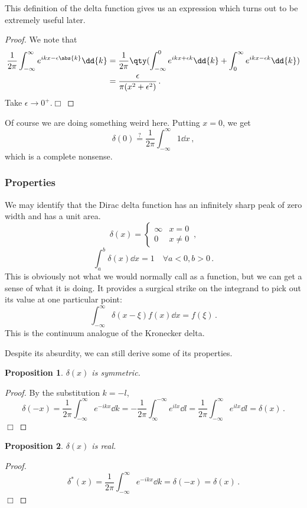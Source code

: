 \documentclass{article}
\theoremstyle{plain}\theoremheaderfont{\normalfont\itshape}\theorembodyfont{\rmfamily}\theoremseparator{.}\newtheorem*{rem}{Remark}\newtheorem*{ex}{Example}\newtheorem*{proof}{Proof}\newtheorem*{altp}{Alternative proof}
\theoremstyle{plain}\theoremheaderfont{\normalfont\bfseries}\theorembodyfont{\rmfamily}\theoremseparator{.}\newtheorem{thm}{Theorem}[section]\newtheorem{lem}[thm]{Lemma}\newtheorem{prop}[thm]{Proposition}\newtheorem*{cor}{Corollary}\newtheorem{defn}[thm]{Definition}\newtheorem{clm}[thm]{Claim}\newtheorem{clminproof}{Claim}
\theoremstyle{break}\theoremheaderfont{\normalfont\itshape}\theorembodyfont{\rmfamily}\theoremseparator{.\medskip}\newtheorem*{proofskip}{Proof}\newtheorem*{exs}{Examples}\newtheorem*{rems}{Remarks}
\theoremstyle{break}\theoremheaderfont{\normalfont\bfseries}\theorembodyfont{\rmfamily}\theoremseparator{.\medskip}\newtheorem{lemskip}[thm]{Lemma}\newtheorem{defnskip}[thm]{Definition}\newtheorem{propskip}[thm]{Proposition}\newtheorem{thmskip}[thm]{Theorem}
\numberwithin{equation}{section}
\newcommand{\qed}{\hfill\ensuremath{\Box}}
\begin{document}
	This definition of the delta function gives us an expression which turns out to be extremely useful later.
	\begin{prop}\label[prop]{Fourier_one}
		\[\delta(x)=\frac{1}{2\pi}\int_{-\infty}^{\infty}e^{ikx}\dd{k}\,.\]
	\end{prop}
	\begin{proof}
		We note that
		\begin{align*}
			\frac{1}{2\pi}\int_{-\infty}^{\infty}e^{ikx-\epsilon\abs{k}}\dd{k}&=\frac{1}{2\pi}\qty(\int_{-\infty}^{0}e^{ikx+\epsilon k}\dd{k}+\int_{0}^{\infty}e^{ikx-\epsilon k}\dd{k})\\
			&=\frac{\epsilon}{\pi(x^2+\epsilon^2)}\,.
		\end{align*}
		Take \(\epsilon\to 0^+\).\qed
	\end{proof}
	Of course we are doing something weird here. Putting \(x=0\), we get
	\[\delta(0)\stackrel{?}{=}\frac{1}{2\pi}\int_{-\infty}^{\infty}1\dd{x}\,,\]
	which is a complete nonsense. 
	
	\subsubsection{Properties}
	We may identify that the Dirac delta function has an infinitely sharp peak of zero width and has a unit area.
	\[\delta(x)=\begin{cases}
		\infty & x=0\\
		0 & x\ne 0
	\end{cases}\,,\]
	\[\int_{a}^{b}\delta(x)\dd{x}=1 \quad \forall a<0, b>0\,.\]
	This is obviously not what we would normally call as a function, but we can get a sense of what it is doing. It provides a surgical strike on the integrand to pick out its value at one particular point:
	\[\int_{-\infty}^{\infty}\delta(x-\xi)f(x)\dd{x}=f(\xi)\,.\]
	This is the continuum analogue of the Kronecker delta.
	
	Despite its absurdity, we can still derive some of its properties.
	\begin{prop}
		\(\delta(x)\) is symmetric.
	\end{prop}
	\begin{proof}
		By the substitution \(k=-l\),
		\[\delta(-x)=\frac{1}{2\pi}\int_{-\infty}^{\infty}e^{-ikx}\dd{k}=-\frac{1}{2\pi}\int_{\infty}^{-\infty}e^{ilx}\dd{l}=\frac{1}{2\pi}\int_{-\infty}^{\infty}e^{ilx}\dd{l}=\delta(x)\,.\]\qed
	\end{proof}
	\begin{prop}
		\(\delta(x)\) is real.
	\end{prop}
	\begin{proof}
		\[\delta^*(x)=\frac{1}{2\pi}\int_{-\infty}^{\infty}e^{-ikx}\dd{k}=\delta(-x)=\delta(x)\,.\]\qed
	\end{proof}
\end{document}
